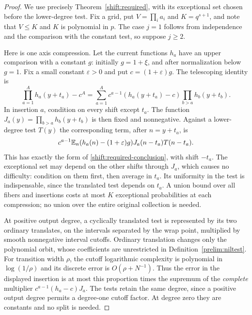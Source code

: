 \begin{proof}
We use precisely Theorem~\ref{shift:required}, with its exceptional set
chosen before the lower-degree test.  Fix a grid, put
$V=\prod_i a_i$ and $K=q^{s+1}$, and note that $V\leq K$ and $K$ is
polynomial in $p$.  The case $j=1$ follows from independence and the
comparison with the constant test, so suppose $j\geq2$.

Here is one axis compression.  Let the current functions $h_a$ have an
upper comparison with a constant $g$: initially $g=1+\xi$, and after
normalization below $g=1$.  Fix a small constant $\varepsilon>0$ and
put $c=(1+\varepsilon)g$.  The telescoping identity is
\[
 \prod_{a=1}^{A}h_a(y+t_a)-c^A
 =\sum_{a=1}^{A}c^{a-1}(h_a(y+t_a)-c)
                 \prod_{b>a}h_b(y+t_b).
\]
In insertion $a$, condition on every shift except $t_a$.  The function
$J_a(y)=\prod_{b>a}h_b(y+t_b)$ is then fixed and nonnegative.  Against
a lower-degree test $T(y)$ the corresponding term, after $n=y+t_a$,
is
\[
 c^{a-1}\mathbb E_n(h_a(n)-(1+\varepsilon)g)
                   J_a(n-t_a)T(n-t_a).
\]
This has exactly the form of \eqref{shift:required-conclusion}, with
shift $-t_a$.  The exceptional set may depend on the other shifts
through $J_a$, which causes no difficulty: condition on them first,
then average in $t_a$.  Its uniformity in the test is indispensable,
since the translated test depends on $t_a$.  A union bound over all
fibers and insertions costs at most $K$ exceptional probabilities at
each compression; no union over the entire original collection is needed.

At positive output degree, a cyclically translated test is represented
by its two ordinary translates, on the intervals separated by the wrap
point, multiplied by smooth nonnegative interval cutoffs.  Ordinary
translation changes only the polynomial orbit, whose coefficients are
unrestricted in Definition~\ref{prelim:niltest}.  For transition width
$\rho$, the cutoff logarithmic complexity is polynomial in
$\log(1/\rho)$ and its discrete error is $O(\rho+N^{-1})$.
Thus the error in the displayed insertion is at most this proportion
times the supremum of the \emph{complete} multiplier
$c^{a-1}(h_a-c)J_a$.  The tests retain the same degree, since a
positive output degree permits a degree-one cutoff factor.  At degree
zero they are constants and no split is needed.


\end{proof}
